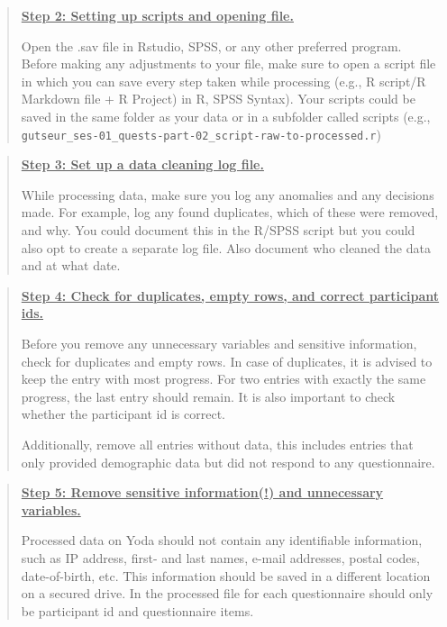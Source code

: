 \documentclass[
  letterpaper,
  DIV=11,
  numbers=noendperiod]{scrreprt}
\begin{document}
\begin{tcolorbox}
\begin{quote}
\textbf{\ul{Step 2: Setting up scripts and opening file.}}

Open the .sav file in Rstudio, SPSS, or any other preferred program.
Before making any adjustments to your file, make sure to open a script
file in which you can save every step taken while processing (e.g., R
script/R Markdown file + R Project) in R, SPSS Syntax). Your scripts
could be saved in the same folder as your data or in a subfolder called
scripts (e.g.,
\texttt{gutseur\_ses-01\_quests-part-02\_script-raw-to-processed.r})
\end{quote}

\begin{quote}
\textbf{\ul{Step 3: Set up a data cleaning log file.}}

While processing data, make sure you log any anomalies and any decisions
made. For example, log any found duplicates, which of these were
removed, and why. You could document this in the R/SPSS script but you
could also opt to create a separate log file. Also document who cleaned
the data and at what date.
\end{quote}

\begin{quote}
\textbf{\ul{Step 4: Check for duplicates, empty rows, and correct
participant ids.}}

Before you remove any unnecessary variables and sensitive information,
check for duplicates and empty rows. In case of duplicates, it is
advised to keep the entry with most progress. For two entries with
exactly the same progress, the last entry should remain. It is also
important to check whether the participant id is correct.

Additionally, remove all entries without data, this includes entries
that only provided demographic data but did not respond to any
questionnaire.
\end{quote}

\begin{quote}
\textbf{\ul{Step 5: Remove sensitive information(!) and unnecessary
variables.}}

Processed data on Yoda should not contain any identifiable information,
such as IP address, first- and last names, e-mail addresses, postal
codes, date-of-birth, etc. This information should be saved in a
different location on a secured drive. In the processed file for each
questionnaire should only be participant id and questionnaire items.
\end{quote}


\end{tcolorbox}
\end{document}
